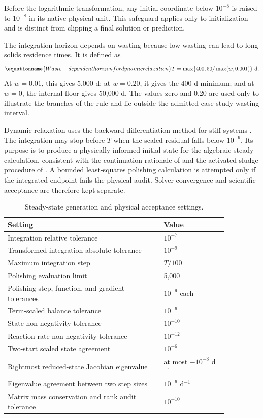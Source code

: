 Before the logarithmic transformation, any initial coordinate below $10^{-8}$ is raised to $10^{-8}$ in its native physical unit. This safeguard applies only to initialization and is distinct from clipping a final solution or prediction.

The integration horizon depends on wasting because low wasting can lead to long solids residence times. It is defined as
\begin{equation}
\equationname{Waste-dependent horizon for dynamic relaxation}
T=\max\{400,50/\max(w,0.001)\}\ \mathrm{d}.
\label{eq:plant_integration_horizon}
\end{equation}
At $w=0.01$, this gives 5{,}000 d; at $w=0.20$, it gives the 400-d minimum; and at $w=0$, the internal floor gives 50{,}000 d. The values zero and 0.20 are used only to illustrate the branches of the rule and lie outside the admitted case-study wasting interval.

Dynamic relaxation uses the backward differentiation method for stiff systems \citep{CurtissHirschfelder1952}. The integration may stop before $T$ when the scaled residual falls below $10^{-9}$. Its purpose is to produce a physically informed initial state for the algebraic steady calculation, consistent with the continuation rationale of \citet{KelleyKeyes1998} and the activated-sludge procedure of \citet{Selerio2026}. A bounded least-squares polishing calculation is attempted only if the integrated endpoint fails the physical audit. Solver convergence and scientific acceptance are therefore kept separate.

\begin{table}[htbp]
\centering\small
\caption{Steady-state generation and physical acceptance settings.}\label{tab:plant_generation_settings}
\begin{tabular}{p{0.61\linewidth}p{0.25\linewidth}}
\toprule Setting & Value\\\midrule
Integration relative tolerance & $10^{-7}$\\
Transformed integration absolute tolerance & $10^{-9}$\\
Maximum integration step & $T/100$\\
Polishing evaluation limit & 5{,}000\\
Polishing step, function, and gradient tolerances & $10^{-9}$ each\\
Term-scaled balance tolerance & $10^{-6}$\\
State non-negativity tolerance & $10^{-10}$\\
Reaction-rate non-negativity tolerance & $10^{-12}$\\
Two-start scaled state agreement & $10^{-6}$\\
Rightmost reduced-state Jacobian eigenvalue & at most $-10^{-8}$ d$^{-1}$\\
Eigenvalue agreement between two step sizes & $10^{-6}$ d$^{-1}$\\
Matrix mass conservation and rank audit tolerance & $10^{-10}$\\
\bottomrule
\end{tabular}
\end{table}

